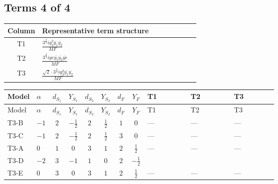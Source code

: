 \documentclass[8pt]{article}
\begin{document}
\begin{landscape}
\subsection*{Terms 4 of 4}
\begin{center}
\begin{tabular}{@{}c >{\raggedright\arraybackslash}p{0.82\linewidth}@{}}
\toprule
Column & Representative term structure \\
\midrule
T1 & \(\displaystyle \frac{3^{\frac{3}{4}} i g_{2}^{2} \overline{y_{1}} \overline{y_{2}}}{MF}\) \\
\midrule
T2 & \(\displaystyle \frac{3^{\frac{3}{4}} i ye \overline{y_{1}} \overline{y_{2}} \overline{ye}}{MF}\) \\
\midrule
T3 & \(\displaystyle \frac{\sqrt{2} \cdot 3^{\frac{3}{4}} i g_{2}^{2} \overline{y_{1}} \overline{y_{2}}}{MF}\) \\
\midrule
\bottomrule
\end{tabular}
\end{center}
\smallskip
\tiny
\begin{longtable}{@{}llcccccc >{\raggedright\arraybackslash}p{0.21\linewidth} >{\raggedright\arraybackslash}p{0.21\linewidth} >{\raggedright\arraybackslash}p{0.21\linewidth}@{}}
\toprule
Model & $\alpha$ & $d_{S_1}$ & $Y_{S_1}$ & $d_{S_2}$ & $Y_{S_2}$ & $d_F$ & $Y_F$ & T1 & T2 & T3 \\
\midrule
\endfirsthead
\toprule
Model & $\alpha$ & $d_{S_1}$ & $Y_{S_1}$ & $d_{S_2}$ & $Y_{S_2}$ & $d_F$ & $Y_F$ & T1 & T2 & T3 \\
\midrule
\endhead
T3-B & $-1$ & $2$ & $-\frac{1}{2}$ & $2$ & $\frac{1}{2}$ & $1$ & $0$ & --- & --- & --- \\
\midrule
T3-C & $-1$ & $2$ & $-\frac{1}{2}$ & $2$ & $\frac{1}{2}$ & $3$ & $0$ & --- & --- & --- \\
\midrule
T3-A & $0$ & $1$ & $0$ & $3$ & $1$ & $2$ & $\frac{1}{2}$ & --- & --- & --- \\
\midrule
T3-D & $-2$ & $3$ & $-1$ & $1$ & $0$ & $2$ & $-\frac{1}{2}$ & \scriptsize\adjustbox{max width=\linewidth}{$\begin{gathered} \frac{25 \cdot 3^{\frac{3}{4}} i g_{2}^{2} \overline{y_{1}} \overline{y_{2}}}{24 MF}\end{gathered}$} & \scriptsize\adjustbox{max width=\linewidth}{$\begin{gathered} - \frac{3^{\frac{3}{4}} i ye \overline{y_{1}} \overline{y_{2}} \overline{ye}}{12 MF}\end{gathered}$} & \scriptsize\adjustbox{max width=\linewidth}{$\begin{gathered} \frac{\sqrt{2} \cdot 3^{\frac{3}{4}} i g_{2}^{2} \overline{y_{1}} \overline{y_{2}}}{6 MF}\end{gathered}$} \\
\midrule
T3-E & $0$ & $3$ & $0$ & $3$ & $1$ & $2$ & $\frac{1}{2}$ & --- & --- & --- \\
\midrule
\bottomrule
\end{longtable}
\clearpage

\end{landscape}
\end{document}
